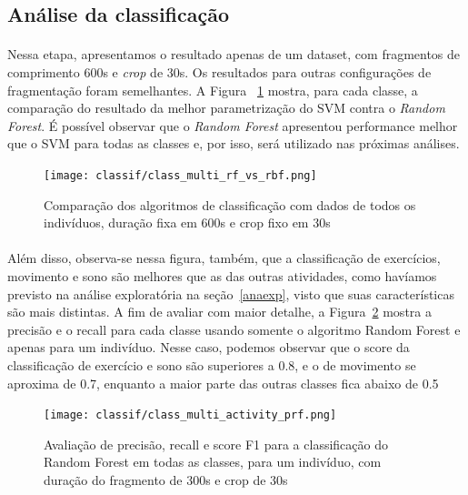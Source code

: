         \subsection{Análise da classificação}
        
            \paragraph{} Nessa etapa, apresentamos o resultado apenas de um dataset, com fragmentos de comprimento 600s e \textit{crop} de 30s. Os resultados para outras configurações de fragmentação foram semelhantes. A Figura ~\ref{svmvsrf} mostra, para cada classe, a comparação do resultado da melhor parametrização do SVM contra o \textit{Random Forest}. É possível observar que o \textit{ Random Forest} apresentou performance melhor que o SVM para todas as classes e, por isso, será utilizado nas próximas análises. 
            
            \begin{figure}[htb!]
            	\centering
            	\texttt{[image: classif/class\_multi\_rf\_vs\_rbf.png]}
            	\caption{Comparação dos algoritmos de classificação com dados de todos os indivíduos, duração fixa em 600s e crop fixo em 30s}
                \label{svmvsrf}
            \end{figure}
            
            \paragraph{} Além disso, observa-se nessa figura, também, que a classificação de exercícios, movimento e sono são melhores que as das outras atividades, como havíamos previsto na análise exploratória na seção~\ref{anaexp}, visto que suas características são mais distintas. A fim de avaliar com maior detalhe, a Figura~\ref{multiclass_prf} mostra a precisão e o recall para cada classe usando somente o algoritmo Random Forest e apenas para um indivíduo. Nesse caso, podemos observar que o score da classificação de exercício e sono são superiores a 0.8, e o de movimento se aproxima de 0.7, enquanto a maior parte das outras classes fica abaixo de 0.5
            
            \begin{figure}[htb!]
            	\centering
            	\texttt{[image: classif/class\_multi\_activity\_prf.png]}
            	\caption{Avaliação de precisão, recall e score F1 para a classificação do Random Forest em todas as classes, para um indivíduo, com duração do fragmento de 300s e crop de 30s}
                \label{multiclass_prf}
            \end{figure}
            
